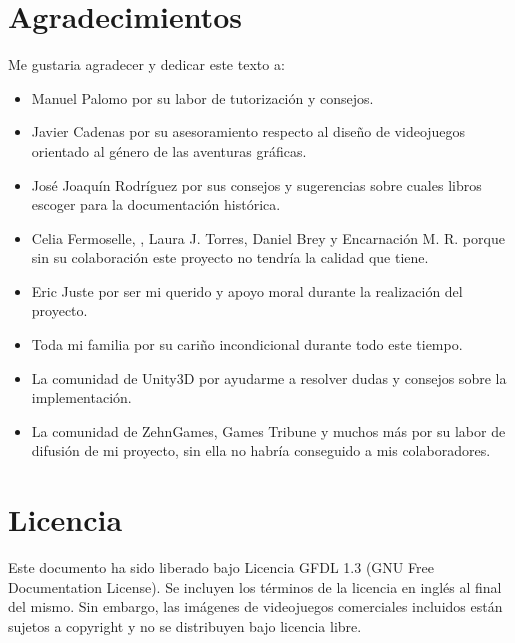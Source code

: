 

\section*{Agradecimientos}

Me gustaria agradecer y dedicar este texto a:
\begin{itemize}
\item Manuel Palomo por su labor de tutorización y consejos.
\item Javier Cadenas por su asesoramiento respecto al diseño de videojuegos orientado al género de las aventuras gráficas.
\item José Joaquín Rodríguez por sus consejos y sugerencias sobre cuales libros escoger para la documentación histórica.
\item Celia Fermoselle, , Laura J. Torres, Daniel Brey y Encarnación M. R. porque sin su colaboración este proyecto no tendría la calidad que tiene. 
\item Eric Juste por ser mi querido  y apoyo moral durante la realización del proyecto.
\item Toda mi familia por su cariño incondicional durante todo este tiempo.
\item La comunidad de Unity3D por ayudarme a resolver dudas y consejos sobre la implementación.
\item La comunidad de ZehnGames, Games Tribune y muchos más por su labor de difusión de mi proyecto, sin ella no habría conseguido a mis colaboradores.
\end{itemize}

\cleardoublepage

\section*{Licencia} %

Este documento ha sido liberado bajo Licencia GFDL 1.3 (GNU Free
Documentation License). Se incluyen los términos de la licencia en
inglés al final del mismo. Sin embargo, las imágenes de videojuegos comerciales incluidos están sujetos a copyright y no se distribuyen bajo licencia libre.\\

